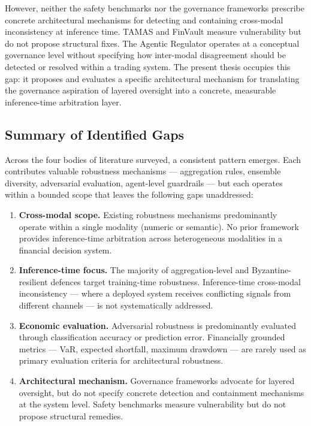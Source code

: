 However, neither the safety benchmarks nor the governance frameworks prescribe
concrete architectural mechanisms for detecting and containing cross-modal
inconsistency at inference time. TAMAS \cite{kavathekar2025tamas} and FinVault
\cite{yang_finvault_2026} measure vulnerability but do not propose structural
fixes. The Agentic Regulator \cite{kurshan_agentic_2025} operates at a
conceptual governance level without specifying how inter-modal disagreement
should be detected or resolved within a trading system. The present thesis
occupies this gap: it proposes and evaluates a specific architectural
mechanism for translating the governance aspiration of layered oversight into
a concrete, measurable inference-time arbitration layer.



\subsection{Summary of Identified Gaps}

Across the four bodies of literature surveyed, a consistent pattern emerges. Each
contributes valuable robustness mechanisms --- aggregation rules, ensemble
diversity, adversarial evaluation, agent-level guardrails --- but each operates
within a bounded scope that leaves the following gaps unaddressed:

\begin{enumerate}
    \item \textbf{Cross-modal scope.} Existing robustness mechanisms predominantly
    operate within a single modality (numeric or semantic). No prior framework
    provides inference-time arbitration across heterogeneous modalities in a
    financial decision system.

    \item \textbf{Inference-time focus.} The majority of aggregation-level and
    Byzantine-resilient defences target training-time robustness. Inference-time
    cross-modal inconsistency --- where a deployed system receives conflicting
    signals from different channels --- is not systematically addressed.

    \item \textbf{Economic evaluation.} Adversarial robustness is predominantly
    evaluated through classification accuracy or prediction error. Financially
    grounded metrics --- VaR, expected shortfall, maximum drawdown --- are rarely
    used as primary evaluation criteria for architectural robustness.

    \item \textbf{Architectural mechanism.} Governance frameworks advocate for
    layered oversight, but do not specify concrete detection and containment
    mechanisms at the system level. Safety benchmarks measure vulnerability but
    do not propose structural remedies.
\end{enumerate}

